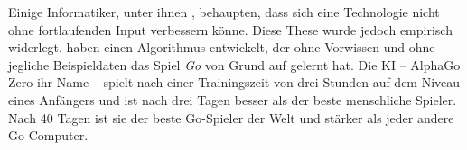 Einige Informatiker, unter ihnen \citeauthor{lanier_who_2013}, behaupten, dass sich eine Technologie nicht ohne fortlaufenden Input verbessern könne.  Diese These wurde jedoch empirisch widerlegt. \citeauthor{silver_mastering_2017} haben einen Algorithmus entwickelt, der ohne Vorwissen und ohne jegliche Beispieldaten das Spiel \emph{Go} von Grund auf gelernt hat. Die KI -- AlphaGo Zero ihr Name -- spielt nach einer Trainingszeit von drei Stunden auf dem Niveau eines Anfängers und ist nach drei Tagen besser als der beste menschliche Spieler. Nach 40 Tagen ist sie der beste Go-Spieler der Welt und stärker als jeder andere Go-Computer. 

